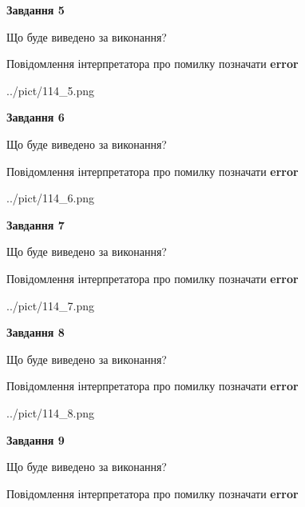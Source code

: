 \documentclass[11pt, ukrainian]{article}
\begin{document}
{\begin {large}
{\begin {center}\textbf{Завдання 5}\end {center}}\par
Що буде виведено за виконання? \par
Повідомлення інтерпретатора про помилку позначати \textbf{error}

\begin{center}
	{../pict/114_5.png}
\end{center}
\newpage

{\begin {center}\textbf{Завдання 6}\end {center}}\par
Що буде виведено за виконання? \par
Повідомлення інтерпретатора про помилку позначати \textbf{error}

\begin{center}
	{../pict/114_6.png}
\end{center}
\newpage

{\begin {center}\textbf{Завдання 7}\end {center}}\par
Що буде виведено за виконання? \par
Повідомлення інтерпретатора про помилку позначати \textbf{error}

\begin{center}
	{../pict/114_7.png}
\end{center}
\newpage

{\begin {center}\textbf{Завдання 8}\end {center}}\par
Що буде виведено за виконання? \par
Повідомлення інтерпретатора про помилку позначати \textbf{error}

\begin{center}
	{../pict/114_8.png}
\end{center}
\newpage

{\begin {center}\textbf{Завдання 9}\end {center}}\par
Що буде виведено за виконання? \par
Повідомлення інтерпретатора про помилку позначати \textbf{error}


\end{large}}
\end{document}
